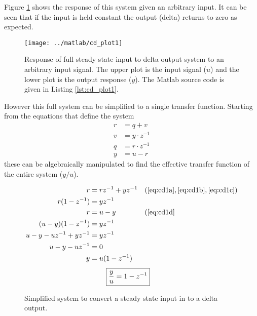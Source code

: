 \documentclass{article}
\begin{document}

Figure \ref{fig:cd_plot1} shows the response of this system given
an arbitrary input.
It can be seen that if the input is held constant the output (delta)
returns to zero as expected.

\begin{figure}[htbp!]
\texttt{[image: ../matlab/cd\_plot1]}
\caption{Response of full steady state input to delta output system
to an arbitrary input signal.
The upper plot is the input signal ($u$) and the lower plot is
the output response ($y$).
The Matlab source code is given in Listing \ref{lst:cd_plot1}.
}
\label{fig:cd_plot1}
\end{figure}

\begin{samepage}
However this full system can be simplified to a single transfer function.
Starting from the equations that define the system
\begin{align}
	r &= q + v \label{eq:cd1a} \\
	v &= y \cdot z^{-1} \label{eq:cd1b} \\
	q &= r \cdot z^{-1} \label{eq:cd1c} \\
	y &= u - r \label{eq:cd1d}
\end{align}
these can be algebraically manipulated to find the effective transfer
function of the entire system ($y/u$).
\end{samepage}

\begin{align*}
	r &= r z^{-1} + y z^{-1} && (\ref{eq:cd1a}, \ref{eq:cd1b}, \ref{eq:cd1c})\\
	r(1 - z^{-1}) &= y z^{-1} \\
	r &= u - y && (\ref{eq:cd1d} \\
	(u - y)(1 - z^{-1}) &= y z^{-1} \\
	u - y - u z^{-1} + y z^{-1} &= y z^{-1} \\
	u - y - u z^{-1} &= 0 \\
	y &= u (1 - z^{-1})
\end{align*}
\begin{align}
	\Aboxed{ \frac{y}{u} &= 1 - z^{-1} }
\end{align}

\begin{figure}[!htbp]
\begin{center}


\end{center}
\caption{Simplified system to convert a steady state input in to
a delta output.}
\label{fig:cd1s}
\end{figure}
\end{document}
